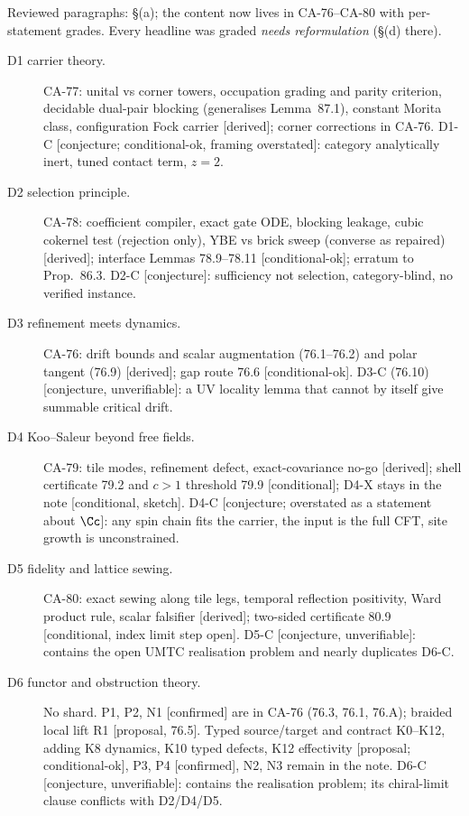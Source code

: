Reviewed paragraphs:  \S(a); the content now lives in CA-76--CA-80 with per-statement grades. Every headline was graded \emph{needs
reformulation} (\S(d) there).
\begin{description}
\item[D1 carrier theory.] CA-77: unital vs corner towers, occupation grading and parity criterion,
decidable dual-pair blocking (generalises Lemma~87.1), constant Morita class, configuration Fock carrier
[derived]; corner corrections in CA-76.  D1-C [conjecture; conditional-ok, framing overstated]: category
analytically inert, tuned contact term, \(z=2\).
\item[D2 selection principle.] CA-78: coefficient compiler, exact gate ODE, blocking leakage, cubic
cokernel test (rejection only), YBE vs brick sweep (converse as repaired) [derived]; interface Lemmas
78.9--78.11 [conditional-ok]; erratum to Prop.~86.3.  D2-C [conjecture]: sufficiency not selection,
category-blind, no verified instance.
\item[D3 refinement meets dynamics.] CA-76: drift bounds and scalar augmentation (76.1--76.2) and polar
tangent (76.9) [derived]; gap route 76.6 [conditional-ok].  D3-C (76.10) [conjecture, unverifiable]: a
UV locality lemma that cannot by itself give summable critical drift.
\item[D4 Koo--Saleur beyond free fields.] CA-79: tile modes, refinement defect, exact-covariance no-go
[derived]; shell certificate 79.2 and \(c>1\) threshold 79.9 [conditional]; D4-X stays in the note
[conditional, sketch].  D4-C [conjecture; overstated as a statement about \(\Cc\)]: any spin chain fits the carrier,
the input is the full CFT, site growth is unconstrained.
\item[D5 fidelity and lattice sewing.] CA-80: exact sewing along tile legs, temporal reflection
positivity, Ward product rule, scalar falsifier [derived]; two-sided certificate 80.9 [conditional,
index limit step open].  D5-C [conjecture, unverifiable]: contains the open UMTC realisation problem and
nearly duplicates D6-C.
\item[D6 functor and obstruction theory.] No shard.  P1, P2, N1 [confirmed] are in CA-76 (76.3, 76.1,
76.A); braided local lift R1 [proposal, 76.5].  Typed source/target and contract K0--K12, adding K8
dynamics, K10 typed defects, K12 effectivity [proposal; conditional-ok], P3, P4 [confirmed], N2, N3
remain in the note.  D6-C [conjecture, unverifiable]: contains the realisation problem; its chiral-limit clause
conflicts with D2/D4/D5.
\end{description}

